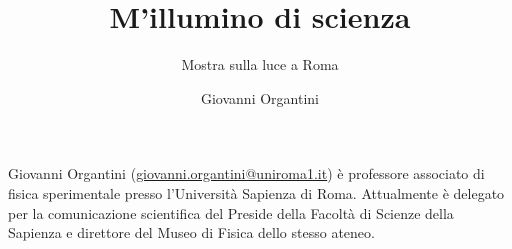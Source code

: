 ﻿\title{M'illumino di scienza}
\subtitle{Mostra sulla luce a Roma}
\suptitle{\phantom{x}}
\author{Giovanni Organtini}
\maketitle
\begin{small}
\pichskip{4mm}
\nobalance



\vfill
\begin{thebiography}{}%
Giovanni Organtini (\url{giovanni.organtini@uniroma1.it}) è professore associato di fisica sperimentale presso l'Università Sapienza di Roma.
Attualmente è delegato per la comunicazione scientifica del Preside della Facoltà di Scienze della Sapienza e direttore del Museo di Fisica
dello stesso ateneo.
\end{thebiography}
\end{small}

